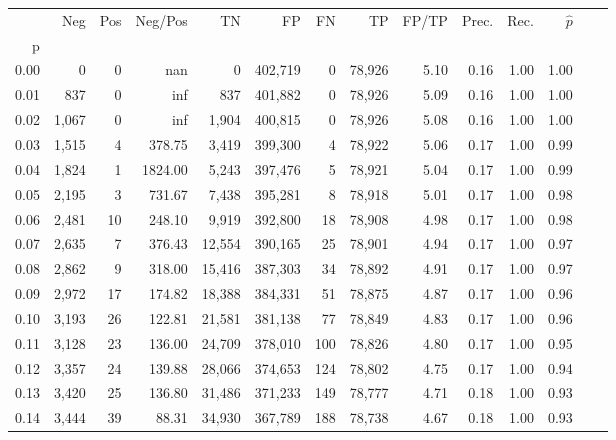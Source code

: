 \begin{tabular}{rrrrrrrrrrrrrr}
\toprule
{} &    Neg &    Pos &  Neg/Pos &       TN &       FP &      FN &      TP & FP/TP & Prec. &  Rec. & $\hat{p}$ \\
p    &        &        &          &          &          &         &         &       &       &       &           \\
\midrule
0.00 &      0 &      0 &      nan &        0 &  402,719 &       0 &  78,926 &  5.10 &  0.16 &  1.00 &      1.00 \\
0.01 &    837 &      0 &      inf &      837 &  401,882 &       0 &  78,926 &  5.09 &  0.16 &  1.00 &      1.00 \\
0.02 &  1,067 &      0 &      inf &    1,904 &  400,815 &       0 &  78,926 &  5.08 &  0.16 &  1.00 &      1.00 \\
0.03 &  1,515 &      4 &   378.75 &    3,419 &  399,300 &       4 &  78,922 &  5.06 &  0.17 &  1.00 &      0.99 \\
0.04 &  1,824 &      1 &  1824.00 &    5,243 &  397,476 &       5 &  78,921 &  5.04 &  0.17 &  1.00 &      0.99 \\
0.05 &  2,195 &      3 &   731.67 &    7,438 &  395,281 &       8 &  78,918 &  5.01 &  0.17 &  1.00 &      0.98 \\
0.06 &  2,481 &     10 &   248.10 &    9,919 &  392,800 &      18 &  78,908 &  4.98 &  0.17 &  1.00 &      0.98 \\
0.07 &  2,635 &      7 &   376.43 &   12,554 &  390,165 &      25 &  78,901 &  4.94 &  0.17 &  1.00 &      0.97 \\
0.08 &  2,862 &      9 &   318.00 &   15,416 &  387,303 &      34 &  78,892 &  4.91 &  0.17 &  1.00 &      0.97 \\
0.09 &  2,972 &     17 &   174.82 &   18,388 &  384,331 &      51 &  78,875 &  4.87 &  0.17 &  1.00 &      0.96 \\
0.10 &  3,193 &     26 &   122.81 &   21,581 &  381,138 &      77 &  78,849 &  4.83 &  0.17 &  1.00 &      0.96 \\
0.11 &  3,128 &     23 &   136.00 &   24,709 &  378,010 &     100 &  78,826 &  4.80 &  0.17 &  1.00 &      0.95 \\
0.12 &  3,357 &     24 &   139.88 &   28,066 &  374,653 &     124 &  78,802 &  4.75 &  0.17 &  1.00 &      0.94 \\
0.13 &  3,420 &     25 &   136.80 &   31,486 &  371,233 &     149 &  78,777 &  4.71 &  0.18 &  1.00 &      0.93 \\
0.14 &  3,444 &     39 &    88.31 &   34,930 &  367,789 &     188 &  78,738 &  4.67 &  0.18 &  1.00 &      0.93 \\

\end{tabular}
